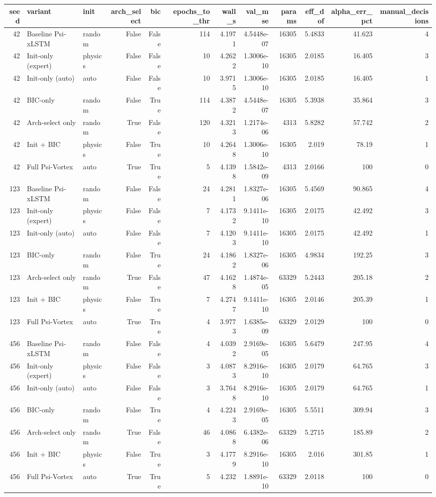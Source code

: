 \begin{tabular}{rllrrrrrrrrr}
\toprule
seed & variant & init & arch_select & bic & epochs_to_thr & wall_s & val_mse & params & eff_dof & alpha_err_pct & manual_decisions \\
\midrule
42 & Baseline Psi-xLSTM & random & False & False & 114 & 4.1971 & 4.5448e-07 & 16305 & 5.4833 & 41.623 & 4 \\
42 & Init-only (expert) & physics & False & False & 10 & 4.2622 & 1.3006e-10 & 16305 & 2.0185 & 16.405 & 3 \\
42 & Init-only (auto) & auto & False & False & 10 & 3.9715 & 1.3006e-10 & 16305 & 2.0185 & 16.405 & 1 \\
42 & BIC-only & random & False & True & 114 & 4.3872 & 4.5448e-07 & 16305 & 5.3938 & 35.864 & 3 \\
42 & Arch-select only & random & True & False & 120 & 4.3213 & 1.2174e-06 & 4313 & 5.8282 & 57.742 & 2 \\
42 & Init + BIC & physics & False & True & 10 & 4.2648 & 1.3006e-10 & 16305 & 2.019 & 78.19 & 1 \\
42 & Full Psi-Vortex & auto & True & True & 5 & 4.1398 & 1.5842e-09 & 4313 & 2.0166 & 100 & 0 \\
123 & Baseline Psi-xLSTM & random & False & False & 24 & 4.2811 & 1.8327e-06 & 16305 & 5.4569 & 90.865 & 4 \\
123 & Init-only (expert) & physics & False & False & 7 & 4.1732 & 9.1411e-10 & 16305 & 2.0175 & 42.492 & 3 \\
123 & Init-only (auto) & auto & False & False & 7 & 4.1203 & 9.1411e-10 & 16305 & 2.0175 & 42.492 & 1 \\
123 & BIC-only & random & False & True & 24 & 4.1862 & 1.8327e-06 & 16305 & 4.9834 & 192.25 & 3 \\
123 & Arch-select only & random & True & False & 47 & 4.1628 & 1.4874e-05 & 63329 & 5.2443 & 205.18 & 2 \\
123 & Init + BIC & physics & False & True & 7 & 4.2747 & 9.1411e-10 & 16305 & 2.0146 & 205.39 & 1 \\
123 & Full Psi-Vortex & auto & True & True & 4 & 3.9773 & 1.6385e-09 & 63329 & 2.0129 & 100 & 0 \\
456 & Baseline Psi-xLSTM & random & False & False & 4 & 4.0392 & 2.9169e-05 & 16305 & 5.6479 & 247.95 & 4 \\
456 & Init-only (expert) & physics & False & False & 3 & 4.0873 & 8.2916e-10 & 16305 & 2.0179 & 64.765 & 3 \\
456 & Init-only (auto) & auto & False & False & 3 & 3.7648 & 8.2916e-10 & 16305 & 2.0179 & 64.765 & 1 \\
456 & BIC-only & random & False & True & 4 & 4.2243 & 2.9169e-05 & 16305 & 5.5511 & 309.94 & 3 \\
456 & Arch-select only & random & True & False & 46 & 4.0868 & 6.4382e-06 & 63329 & 5.2715 & 185.89 & 2 \\
456 & Init + BIC & physics & False & True & 3 & 4.1779 & 8.2916e-10 & 16305 & 2.016 & 301.85 & 1 \\
456 & Full Psi-Vortex & auto & True & True & 5 & 4.232 & 1.8891e-10 & 63329 & 2.0118 & 100 & 0 \\
\bottomrule
\end{tabular}
